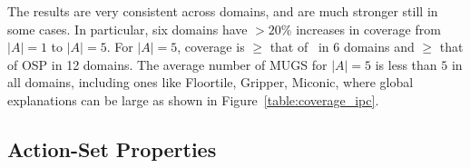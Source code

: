 %
%

The results are very consistent across domains, and are much stronger
still in some cases.
%
%
In particular, six domains have $> 20\%$ increases in coverage from
$|A|=1$ to $|A|=5$.
%
%
%
For $|A|=5$, coverage is $\geq$ that of \hlmcut\ in 6 domains and
$\geq$ that of OSP in 12 domains.
%
The average number of MUGS for $|A|=5$ is less than $5$ in all
domains, including ones like Floortile, Gripper, Miconic, 
%
%
where global explanations can be large as shown in
Figure~\ref{table:coverage_ipc}.

%





\subsection{Action-Set Properties}
\label{experiments:asp}


